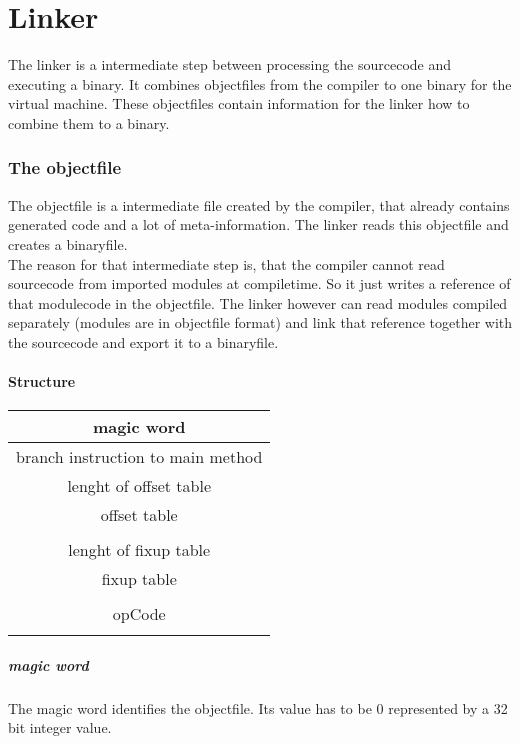 \part{Linker}
The linker is a intermediate step between processing the sourcecode and executing a
binary. It combines objectfiles from the compiler to one binary for the virtual
machine. These objectfiles contain information for the linker how to combine
them to a binary. 

\section{The objectfile}
\label{objectfile}
The objectfile is a intermediate file created by the compiler, that already
contains generated code and a lot of meta-information. The linker reads this
objectfile and creates a binaryfile. \\
The reason for that intermediate step is, that the compiler cannot read sourcecode
from imported modules at compiletime. So it just writes a reference of that modulecode
in the objectfile. The linker however can read modules compiled separately
(modules are in objectfile format) and link that reference together with the
sourcecode and export it to a binaryfile.
\subsection{Structure}
\label{objectfile_structure}

\begin{tabular}{|c|}
\hline
magic word \\
\hline 
branch instruction to main method \\
\hline
lenght of offset table \\
\hline
offset table \\ \\
\hline
lenght of fixup table \\
\hline
fixup table \\ \\
\hline
opCode \\ \\
\hline 
\end{tabular}

\subsubsection{magic word} 
\label{magic_word}
The magic word identifies the objectfile. Its value has to be $0$ represented
by a 32 bit integer value. 
